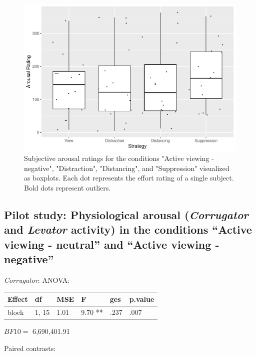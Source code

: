 \documentclass[
  english,
  man,floatsintext]{apa6}
\begin{document}
\begin{figure}[H]
\includegraphics[width=0.75\linewidth]{Manuscript_ERED_Stage1_files/figure-latex/FigSubjArousalRegPilot-1} \caption{Subjective arousal ratings for the conditions "Active viewing - negative", "Distraction", "Distancing", and "Suppression" visualized as boxplots. Each dot represents the effort rating of a single subject. Bold dots represent outliers.}\label{fig:FigSubjArousalRegPilot}
\end{figure}

\hypertarget{pilot-study-physiological-arousal-corrugator-and-levator-activity-in-the-conditions-active-viewing---neutral-and-active-viewing---negative}{%
\subsection{\texorpdfstring{Pilot study: Physiological arousal (\emph{Corrugator} and \emph{Levator} activity) in the conditions ``Active viewing - neutral'' and ``Active viewing - negative''}{Pilot study: Physiological arousal (Corrugator and Levator activity) in the conditions ``Active viewing - neutral'' and ``Active viewing - negative''}}\label{pilot-study-physiological-arousal-corrugator-and-levator-activity-in-the-conditions-active-viewing---neutral-and-active-viewing---negative}}

\emph{Corrugator}:
ANOVA:

\begin{tabular}{l|l|l|l|l|l}
\hline
Effect & df & MSE & F & ges & p.value\\
\hline
block & 1, 15 & 1.01 & 9.70 ** & .237 & .007\\
\hline
\end{tabular}

\(BF10=\) 6,690,401.91

Paired contrasts:
\end{document}
